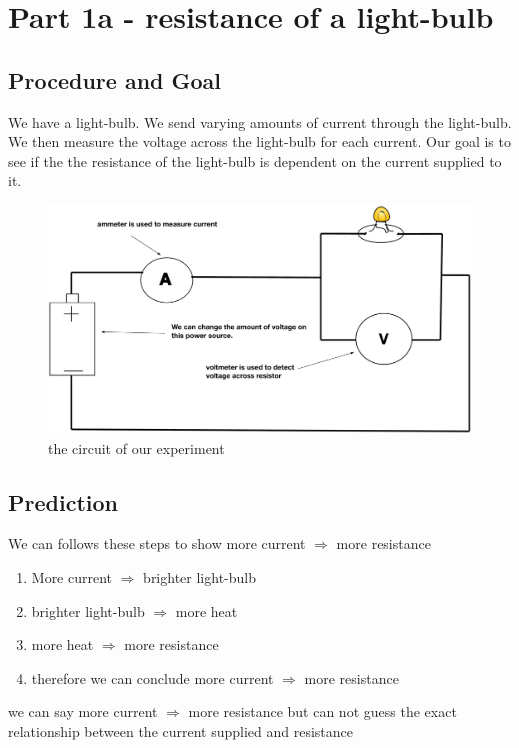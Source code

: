 \documentclass[12pt]{article}
\begin{document}
\section*{Part 1a - resistance of a light-bulb}
\subsection*{Procedure and Goal}
 We have a light-bulb. We send varying amounts of current through the light-bulb. We then measure the voltage across the light-bulb for each current. Our goal is to see if the the resistance of the light-bulb is dependent on the current supplied to it. 

 \begin{figure}[h]
	 \centering
	 \includegraphics[scale = .35]{figOne}
	 \caption{the circuit of our experiment}
  \end{figure}

\subsection*{Prediction}
We can follows these steps to show more current $\Rightarrow$ more resistance

\begin{enumerate}
\item 
More current $\Rightarrow$ brighter light-bulb
\item 
brighter light-bulb $\Rightarrow$ more heat
\item 
more heat  $\Rightarrow$ more resistance
\item 
therefore we can conclude more current $\Rightarrow$ more resistance  
\end{enumerate}
we can say more current $\Rightarrow$ more resistance but can not guess the exact relationship between the current supplied and resistance
\end{document}

